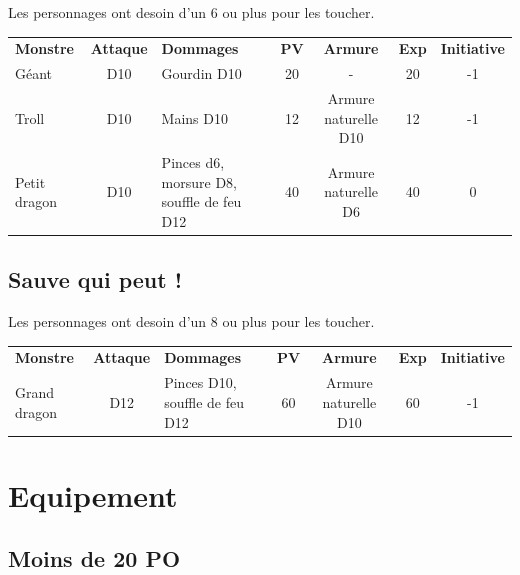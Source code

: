 \documentclass[a4paper, 11pt, twoside]{article}
\begin{document}
Les personnages ont desoin d'un 6 ou plus pour les toucher.

\begin{longtable}{lcp{5cm}cccc}
\textbf{Monstre} & \textbf{Attaque} & \textbf{Dommages} & \textbf{PV} & \textbf{Armure} & \textbf{Exp} & \textbf{Initiative}\\
Géant & D10 & Gourdin D10 & 20 & - & 20 & -1\\
Troll & D10 & Mains D10 & 12 & Armure naturelle D10 & 12 & -1\\
Petit dragon & D10 & Pinces d6, morsure D8, souffle de feu D12 & 40 & Armure naturelle D6 & 40 & 0\\
\end{longtable}

\subsection{Sauve qui peut !}
\label{sec:org7f77509}

Les personnages ont desoin d'un 8 ou plus pour les toucher.

\begin{longtable}{lcp{5cm}cccc}
\textbf{Monstre} & \textbf{Attaque} & \textbf{Dommages} & \textbf{PV} & \textbf{Armure} & \textbf{Exp} & \textbf{Initiative}\\
Grand dragon & D12 & Pinces D10, souffle de feu D12 & 60 & Armure naturelle D10 & 60 & -1\\
\end{longtable}

\section{Equipement}
\label{sec:org2fcfdaf}

\subsection{Moins de 20 PO}
\label{sec:org11a7953}
\end{document}
